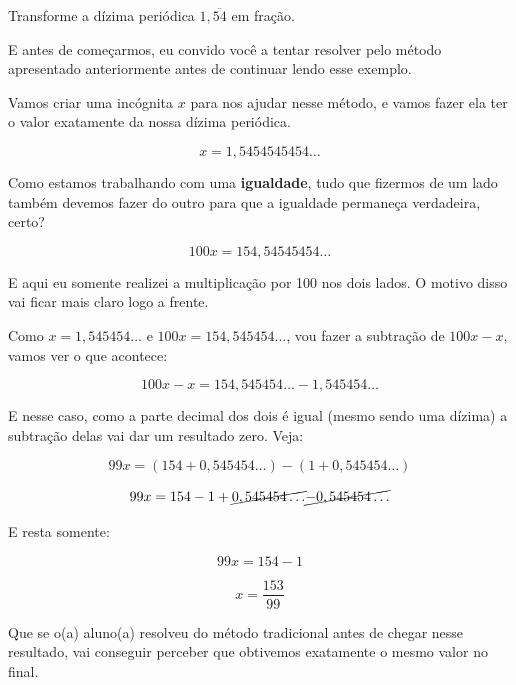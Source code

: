 \begin{exemplo}
    Transforme a dízima periódica \(1,\overline{54}\) em fração.

    \vspace{0.5cm}

    E antes de começarmos, eu convido você a tentar resolver pelo método apresentado anteriormente antes de continuar lendo esse exemplo.

    \vspace{0.5cm}

    Vamos criar uma incógnita \(x\) para nos ajudar nesse método, e vamos fazer ela ter o valor exatamente da nossa dízima periódica.

    \begin{equation}
        x=1,5454545454\dots
    \end{equation}

    Como estamos trabalhando com uma \textbf{igualdade}, tudo que fizermos de um lado também devemos fazer do outro para que a igualdade permaneça verdadeira, certo?

    \begin{equation}
        100x=154,54545454\dots
    \end{equation}

    E aqui eu somente realizei a multiplicação por 100 nos dois lados. O motivo disso vai ficar mais claro logo a frente.

    \vspace{0.5cm}

    Como \(x=1,545454\dots\) e \(100x=154,545454\dots\), vou fazer a subtração de \(100x-x\), vamos ver o que acontece:

    \begin{equation}
        100x-x=154,545454\dots-1,545454\dots
    \end{equation}

    E nesse caso, como a parte decimal dos dois é igual (mesmo sendo uma dízima) a subtração delas vai dar um resultado zero. Veja:
    
    \begin{equation}
        99x=(154+0,545454\dots)-(1+0,545454\dots)
    \end{equation}

    \begin{equation}
        99x=154-1+\cancel{0,545454\dots}\cancel{-0,545454\dots}
    \end{equation}

    E resta somente:

    \begin{equation}
        99x=154-1
    \end{equation}

    \begin{equation}
        x=\frac{153}{99}
    \end{equation}

    Que se o(a) aluno(a) resolveu do método tradicional antes de chegar nesse resultado, vai conseguir perceber que obtivemos exatamente o mesmo valor no final.
\end{exemplo}

